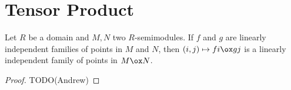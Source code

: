 \section{Tensor Product}


\begin{lemma}
  \label{0-tensor-lin-indep}
  \uses{}
  \leanok
  \mathlibok

  Let $R$ be a domain and $M, N$ two $R$-semimodules.
  If $f$ and $g$ are linearly independent families of points in $M$ and $N$, then $(i, j) \mapsto f i \ox g j$ is a linearly independent family of points in $M \ox N$.
\end{lemma}
\begin{proof}
  \uses{}
  \leanok

  TODO(Andrew)
\end{proof}
